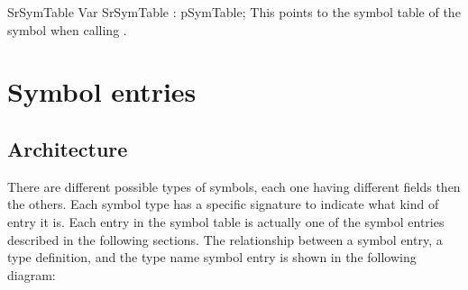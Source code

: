 \documentclass [12pt]{article}
\begin{document}
\begin{variable}{SrSymTable}
\Declaration
Var SrSymTable : pSymTable;
\Description
This points to the symbol table of the symbol  when calling
. 
\end{variable}

\section{Symbol entries}
\label{sec:mylabel3}

\subsection{Architecture}
\label{subsec:architecturees}

There are different possible types of symbols, each one having different
fields then the others. Each symbol type has a specific signature to
indicate what kind of entry it is. Each entry in the symbol table is
actually one of the symbol entries described in the following sections. The
relationship between a symbol entry, a type definition, and the type name
symbol entry is shown in the following diagram:
\end{document}
